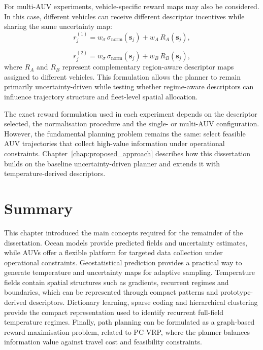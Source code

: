 For multi-AUV experiments, vehicle-specific reward maps may also be considered. In this case, different vehicles can receive different descriptor incentives while sharing the same uncertainty map:
\begin{equation}
r^{(1)}_j =
w_{\sigma}\,\sigma_{\mathrm{norm}}(\mathbf{s}_j)
+
w_A\,R_A(\mathbf{s}_j),
\end{equation}

\begin{equation}
r^{(2)}_j =
w_{\sigma}\,\sigma_{\mathrm{norm}}(\mathbf{s}_j)
+
w_B\,R_B(\mathbf{s}_j),
\end{equation}
where $R_A$ and $R_B$ represent complementary region-aware descriptor maps assigned to different vehicles. This formulation allows the planner to remain primarily uncertainty-driven while testing whether regime-aware descriptors can influence trajectory structure and fleet-level spatial allocation.

The exact reward formulation used in each experiment depends on the descriptor selected, the normalisation procedure and the single- or multi-AUV configuration. However, the fundamental planning problem remains the same: select feasible AUV trajectories that collect high-value information under operational constraints. Chapter~\ref{chap:proposed_approach} describes how this dissertation builds on the baseline uncertainty-driven planner and extends it with temperature-derived descriptors.


\section{Summary} \label{sec:background_summary}

This chapter introduced the main concepts required for the remainder of the dissertation. Ocean models provide predicted fields and uncertainty estimates, while AUVs offer a flexible platform for targeted data collection under operational constraints. Geostatistical prediction provides a practical way to generate temperature and uncertainty maps for adaptive sampling. Temperature fields contain spatial structures such as gradients, recurrent regimes and boundaries, which can be represented through compact patterns and prototype-derived descriptors. Dictionary learning, sparse coding and hierarchical clustering provide the compact representation used to identify recurrent full-field temperature regimes. Finally, path planning can be formulated as a graph-based reward maximisation problem, related to PC-VRP, where the planner balances information value against travel cost and feasibility constraints.

